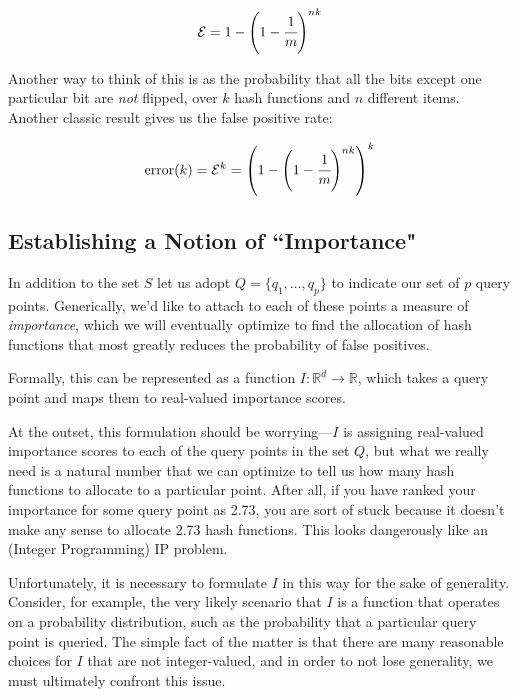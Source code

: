 \documentclass[11pt]{article}
\begin{document}
\begin{equation}
\mathcal{E} = 1 - \left(1 - \cfrac{1}{m} \right)^{nk}
\end{equation}

Another way to think of this is as the probability that all the bits except one particular bit are \textit{not} flipped, over $k$ hash functions and $n$ different items. Another classic result gives us the false positive rate:

\begin{equation}
\text{error}(k) = \mathcal{E}^k = \left( 1 - \left( 1 - \cfrac{1}{m} \right)^{nk} \right)^k
\end{equation}

\subsection{Establishing a Notion of ``Importance"}

In addition to the set $S$ let us adopt $Q = \{ q_1, \ldots, q_p \}$ to indicate our set of $p$ query points. Generically, we'd like to attach to each of these points a measure of \textit{importance}, which we will eventually optimize to find the allocation of hash functions that most greatly reduces the probability of false positives.

Formally, this can be represented as a function $I : \mathbb{R}^d \rightarrow \mathbb{R}$, which takes a query point and maps them to real-valued importance scores.

At the outset, this formulation should be worrying---$I$ is assigning real-valued importance scores to each of the query points in the set $Q$, but what we really need is a natural number that we can optimize to tell us how many hash functions to allocate to a particular point. After all, if you have ranked your importance for some query point as 2.73, you are sort of stuck because it doesn't make any sense to allocate 2.73 hash functions. This looks dangerously like an (Integer Programming) IP problem.

Unfortunately, it is necessary to formulate $I$ in this way for the sake of generality. Consider, for example, the very likely scenario that $I$ is a function that operates on a probability distribution, such as the probability that a particular query point is queried. The simple fact of the matter is that there are many reasonable choices for $I$ that are not integer-valued, and in order to not lose generality, we must ultimately confront this issue.
\end{document}
